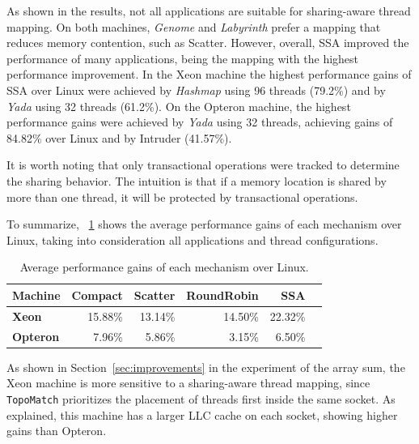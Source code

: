 
As shown in the results, not all applications are suitable for sharing-aware thread mapping. On both machines, \emph{Genome} and \emph{Labyrinth} prefer a mapping that reduces memory contention, such as Scatter. However, overall, SSA improved the performance of many applications, being the mapping with the highest performance improvement. In the Xeon machine the highest performance gains of SSA over Linux were achieved by \emph{Hashmap} using 96 threads (79.2\%) and by \emph{Yada} using 32 threads (61.2\%). On the Opteron machine, the highest performance gains were achieved by \emph{Yada} using 32 threads, achieving gains of 84.82\% over Linux and by Intruder (41.57\%).


It is worth noting that only transactional operations were tracked to determine the sharing behavior. The intuition is that if a memory location is shared by more than one thread, it will be protected by transactional operations.

To summarize, \tablename~\ref{tab:resultsStatic} shows the average performance gains of each mechanism over Linux, taking into consideration all applications and thread configurations.
\begin{table}[!tb]
	\centering
	\caption{Average performance gains of each mechanism over Linux.}
	\label{tab:resultsStatic}
	\begin{tabular}{lrrrrr}
		\toprule
		\textbf{Machine}  & \textbf{Compact} & \textbf{Scatter} & \textbf{Round\textbf{}Robin} & \textbf{SSA}  \\
		\midrule
		\textbf{Xeon}   & 15.88\%          & 13.14\%          & 14.50\%            & 22.32\%   \\
		\textbf{Opteron} & 7.96\%           & 5.86\%           & 3.15\%            & 6.50\%      \\
		\bottomrule
	\end{tabular}
\end{table}
As shown in Section~\ref{sec:improvements} in the experiment of the array sum, the Xeon machine is more sensitive to a sharing-aware thread mapping, since \texttt{TopoMatch} prioritizes the placement of threads first inside the same socket. As explained, this machine has a larger LLC cache on each socket, showing higher gains than Opteron.

